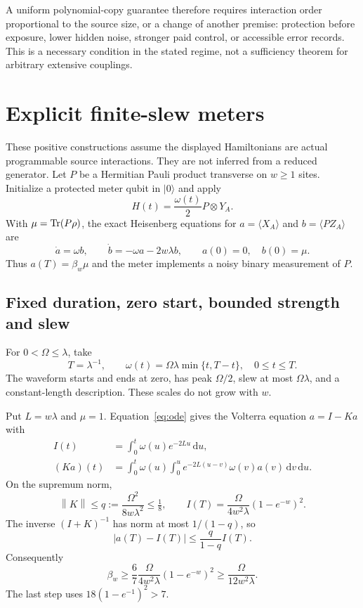 \documentclass[11pt,a4paper]{article}
\newcommand{\norm}[1]{\left\lVert #1\right\rVert}
\newcommand{\ket}[1]{\lvert #1\rangle}\newcommand{\bra}[1]{\langle #1\rvert}
\begin{document}
A uniform polynomial-copy guarantee therefore requires interaction order proportional to the source size, or a change of another premise: protection before exposure, lower hidden noise, stronger paid control, or accessible error records. This is a necessary condition in the stated regime, not a sufficiency theorem for arbitrary extensive couplings.

\section{Explicit finite-slew meters}
\label{sec:meters}

These positive constructions assume the displayed Hamiltonians are actual programmable source interactions. They are not inferred from a reduced generator. Let $P$ be a Hermitian Pauli product transverse on $w\ge1$ sites. Initialize a protected meter qubit in $\ket0$ and apply
\begin{equation}
H(t)=\frac{\omega(t)}2P\otimes Y_A.
\end{equation}
With $\mu=\operatorname{Tr}(P\rho)$, the exact Heisenberg equations for $a=\langle X_A\rangle$ and $b=\langle PZ_A\rangle$ are
\begin{equation}
\dot a=\omega b,\qquad\dot b=-\omega a-2w\lambda b,\qquad a(0)=0,\quad b(0)=\mu.
\label{eq:ode}
\end{equation}
Thus $a(T)=\beta_w\mu$ and the meter implements a noisy binary measurement of $P$.

\subsection{Fixed duration, zero start, bounded strength and slew}
For $0<\Omega\le\lambda$, take
\begin{equation}
T=\lambda^{-1},\qquad\omega(t)=\Omega\lambda\min\{t,T-t\},\quad0\le t\le T.
\end{equation}
The waveform starts and ends at zero, has peak $\Omega/2$, slew at most $\Omega\lambda$, and a constant-length description. These scales do not grow with $w$.

Put $L=w\lambda$ and $\mu=1$. Equation~\eqref{eq:ode} gives the Volterra equation $a=I-Ka$ with
\begin{align}
I(t)&=\int_0^t\omega(u)e^{-2Lu}\,\mathrm du,\\
(Ka)(t)&=\int_0^t\omega(u)\int_0^u e^{-2L(u-v)}\omega(v)a(v)\,\mathrm dv\,\mathrm du.
\end{align}
On the supremum norm,
\begin{equation}
\norm K\le q:=\frac{\Omega^2}{8w\lambda^2}\le\tfrac18,\qquad
I(T)=\frac{\Omega}{4w^2\lambda}(1-e^{-w})^2.
\end{equation}
The inverse $(I+K)^{-1}$ has norm at most $1/(1-q)$, so
\begin{equation}
|a(T)-I(T)|\le\frac q{1-q}I(T).
\end{equation}
Consequently
\begin{equation}
\boxed{\beta_w\ge\frac67\frac{\Omega}{4w^2\lambda}(1-e^{-w})^2\ge\frac{\Omega}{12w^2\lambda}.}
\label{eq:beta}
\end{equation}
The last step uses $18(1-e^{-1})^2>7$.
\end{document}
